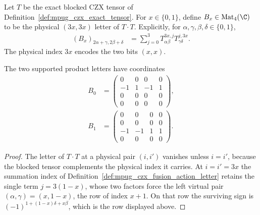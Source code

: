 \begin{definition}
    \label{def:mpug_czx_fusion_action_letter}
    \leanok
    Let $T$ be the exact blocked CZX tensor of
    Definition~\ref{def:mpug_czx_exact_tensor}. For $x\in\{0,1\}$, define
    $B_x\in\operatorname{Mat}_4(\C)$ to be the physical $(3x,3x)$ letter
    of $T\mathbin{\cdot}T$. Explicitly, for
    $\alpha,\gamma,\beta,\delta\in\{0,1\}$,
    \begin{align}
        (B_x)_{2\alpha+\gamma,2\beta+\delta}
         & =\sum_{j=0}^3 T^{3x,j}_{\alpha\beta}T^{j,3x}_{\gamma\delta}.
    \end{align}
    The physical index $3x$ encodes the two bits $(x,x)$.
\end{definition}

\begin{lemma}
    \label{thm:mpug_czx_supported_letter_coordinates}
    \leanok
    The two supported product letters have coordinates
    \begin{align}
        B_0 & =\begin{pmatrix}
                   0 & 0 & 0 & 0 \\-1&1&-1&1\\0&0&0&0\\0&0&0&0
               \end{pmatrix}, \\
        B_1 & =\begin{pmatrix}
                   0 & 0 & 0 & 0 \\0&0&0&0\\-1&-1&1&1\\0&0&0&0
               \end{pmatrix}.
        \label{eq:mpug_czx_supported_letters}
    \end{align}
\end{lemma}
\begin{proof}\leanok
    The letter of $T\mathbin{\cdot}T$ at a physical pair $(i,i')$ vanishes
    unless $i=i'$, because the blocked tensor complements the physical index
    it carries. At $i=i'=3x$ the summation index of
    Definition~\ref{def:mpug_czx_fusion_action_letter} retains the single
    term $j=3(1-x)$, whose two factors force the left virtual pair
    $(\alpha,\gamma)=(x,1-x)$, the row of index $x+1$. On that row the
    surviving sign is $(-1)^{1+(1-x)\delta+x\beta}$, which is the row
    displayed above.
\end{proof}

